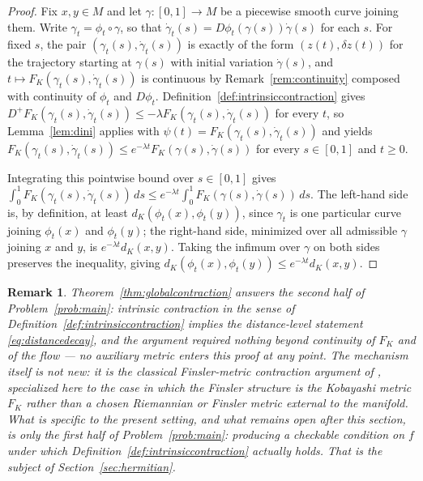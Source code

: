 \documentclass[preprint,12pt,authoryear]{elsarticle}
\newtheorem{remark}{Remark}
\newtheorem{proof}{Proof}
\begin{document}
\begin{proof}
Fix $x,y\in M$ and let $\gamma:[0,1]\to M$ be a piecewise smooth curve joining them. Write $\gamma_t=\phi_t\circ\gamma$, so that $\dot\gamma_t(s)=D\phi_t(\gamma(s))\dot\gamma(s)$ for each $s$. For fixed $s$, the pair $(\gamma_t(s),\dot\gamma_t(s))$ is exactly of the form $(z(t),\delta z(t))$ for the trajectory starting at $\gamma(s)$ with initial variation $\dot\gamma(s)$, and $t\mapsto F_K(\gamma_t(s),\dot\gamma_t(s))$ is continuous by Remark~\ref{rem:continuity} composed with continuity of $\phi_t$ and $D\phi_t$. Definition~\ref{def:intrinsiccontraction} gives $D^+F_K(\gamma_t(s),\dot\gamma_t(s))\le-\lambda F_K(\gamma_t(s),\dot\gamma_t(s))$ for every $t$, so Lemma~\ref{lem:dini} applies with $\psi(t)=F_K(\gamma_t(s),\dot\gamma_t(s))$ and yields $F_K(\gamma_t(s),\dot\gamma_t(s))\le e^{-\lambda t}F_K(\gamma(s),\dot\gamma(s))$ for every $s\in[0,1]$ and $t\ge0$.

Integrating this pointwise bound over $s\in[0,1]$ gives $\int_0^1F_K(\gamma_t(s),\dot\gamma_t(s))\,ds\le e^{-\lambda t}\int_0^1F_K(\gamma(s),\dot\gamma(s))\,ds$. The left-hand side is, by definition, at least $d_K(\phi_t(x),\phi_t(y))$, since $\gamma_t$ is one particular curve joining $\phi_t(x)$ and $\phi_t(y)$; the right-hand side, minimized over all admissible $\gamma$ joining $x$ and $y$, is $e^{-\lambda t}d_K(x,y)$. Taking the infimum over $\gamma$ on both sides preserves the inequality, giving $d_K(\phi_t(x),\phi_t(y))\le e^{-\lambda t}d_K(x,y)$.
\end{proof}

\begin{remark}
Theorem~\ref{thm:globalcontraction} answers the second half of Problem~\ref{prob:main}: intrinsic contraction in the sense of Definition~\ref{def:intrinsiccontraction} implies the distance-level statement \eqref{eq:distancedecay}, and the argument required nothing beyond continuity of $F_K$ and of the flow — no auxiliary metric enters this proof at any point. The mechanism itself is not new: it is the classical Finsler-metric contraction argument of \cite{forni2014differential}, specialized here to the case in which the Finsler structure is the Kobayashi metric $F_K$ rather than a chosen Riemannian or Finsler metric external to the manifold. What is specific to the present setting, and what remains open after this section, is only the first half of Problem~\ref{prob:main}: producing a checkable condition on $f$ under which Definition~\ref{def:intrinsiccontraction} actually holds. That is the subject of Section~\ref{sec:hermitian}.
\end{remark}
\end{document}
